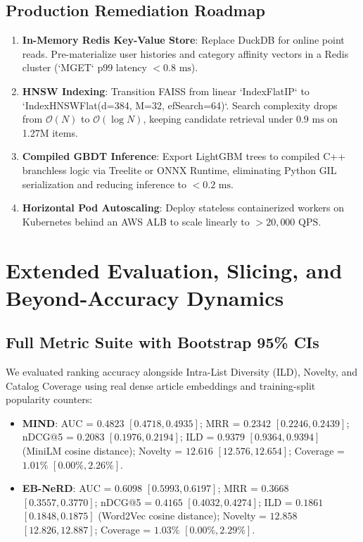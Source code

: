 \documentclass[11pt,a4paper]{article}
\begin{document}
\subsection{Production Remediation Roadmap}
\begin{enumerate}[leftmargin=1.8em, itemsep=2pt]
    \item \textbf{In-Memory Redis Key-Value Store}: Replace DuckDB for online point reads. Pre-materialize user histories and category affinity vectors in a Redis cluster (`MGET` p99 latency $< 0.8\text{ ms}$).
    \item \textbf{HNSW Indexing}: Transition FAISS from linear `IndexFlatIP` to `IndexHNSWFlat(d=384, M=32, efSearch=64)`. Search complexity drops from $\mathcal{O}(N)$ to $\mathcal{O}(\log N)$, keeping candidate retrieval under $0.9\text{ ms}$ on 1.27M items.
    \item \textbf{Compiled GBDT Inference}: Export LightGBM trees to compiled C++ branchless logic via Treelite or ONNX Runtime, eliminating Python GIL serialization and reducing inference to $< 0.2\text{ ms}$.
    \item \textbf{Horizontal Pod Autoscaling}: Deploy stateless containerized workers on Kubernetes behind an AWS ALB to scale linearly to $> 20,000\text{ QPS}$.
\end{enumerate}

\section{Extended Evaluation, Slicing, and Beyond-Accuracy Dynamics}

\subsection{Full Metric Suite with Bootstrap 95\% CIs}
We evaluated ranking accuracy alongside Intra-List Diversity (ILD), Novelty, and Catalog Coverage using real dense article embeddings and training-split popularity counters:
\begin{itemize}[itemsep=1pt]
    \item \textbf{MIND}: AUC = $0.4823$ $[0.4718, 0.4935]$; MRR = $0.2342$ $[0.2246, 0.2439]$; nDCG@5 = $0.2083$ $[0.1976, 0.2194]$; ILD = $0.9379$ $[0.9364, 0.9394]$ (MiniLM cosine distance); Novelty = $12.616$ $[12.576, 12.654]$; Coverage = $1.01\%$ $[0.00\%, 2.26\%]$.
    \item \textbf{EB-NeRD}: AUC = $0.6098$ $[0.5993, 0.6197]$; MRR = $0.3668$ $[0.3557, 0.3770]$; nDCG@5 = $0.4165$ $[0.4032, 0.4274]$; ILD = $0.1861$ $[0.1848, 0.1875]$ (Word2Vec cosine distance); Novelty = $12.858$ $[12.826, 12.887]$; Coverage = $1.03\%$ $[0.00\%, 2.29\%]$.
\end{itemize}
\end{document}
